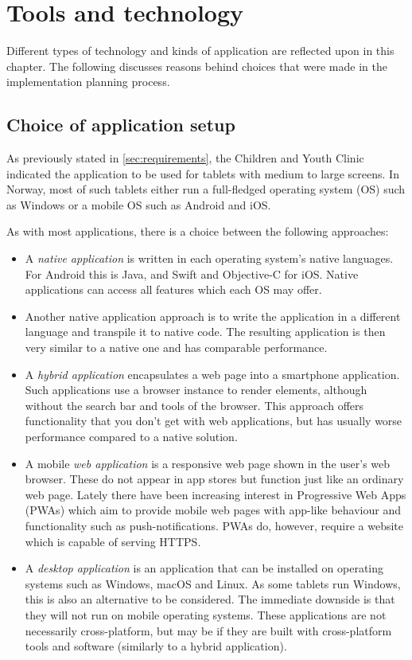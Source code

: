 \chapter{Tools and technology}
\label{ch:tools}

Different types of technology and kinds of application are reflected upon in this chapter. The following discusses reasons behind choices that were made in the implementation planning process.

\section{Choice of application setup}
\label{sec:appsetup}


As previously stated in \autoref{sec:requirements}, the Children and Youth Clinic indicated the application to be used for tablets with medium to large screens. In Norway, most of such tablets either run a full-fledged operating system (OS) such as Windows or a mobile OS such as Android and iOS. 

As with most applications, there is a choice between the following approaches:

\begin{itemize}
    \item A \emph{native application} is written in each operating system's native languages. For Android this is Java, and Swift and Objective-C for iOS. Native applications can access all features which each OS may offer.
    \item Another native application approach is to write the application in a different language and transpile it to native code. The resulting application is then very similar to a native one and has comparable performance.
    \item A \emph{hybrid application} encapsulates a web page into a smartphone application. Such applications use a browser instance to render elements, although without the search bar and tools of the browser. This approach offers functionality that you don't get with web applications, but has usually worse performance compared to a native solution.
    \item A mobile \emph{web application} is a responsive web page shown in the user's web browser. These do not appear in app stores but function just like an ordinary web page. Lately there have been increasing interest in Progressive Web Apps (PWAs) which aim to provide mobile web pages with app-like behaviour and functionality such as push-notifications. PWAs do, however, require a website which is capable of serving HTTPS.
    \item A \emph{desktop application} is an application that can be installed on operating systems such as Windows, macOS and Linux. As some tablets run Windows, this is also an alternative to be considered. The immediate downside is that they will not run on mobile operating systems. These applications are not necessarily cross-platform, but may be if they are built with cross-platform tools and software (similarly to a hybrid application).
\end{itemize}

